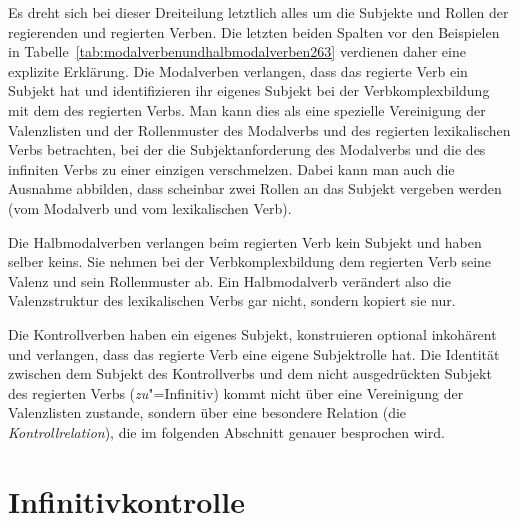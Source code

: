 

Es dreht sich bei dieser Dreiteilung letztlich alles um die Subjekte und Rollen der regierenden und regierten Verben.
Die letzten beiden Spalten vor den Beispielen in Tabelle~\ref{tab:modalverbenundhalbmodalverben263} verdienen daher eine explizite Erklärung.
Die Modalverben verlangen, dass das regierte Verb ein Subjekt hat und identifizieren ihr eigenes Subjekt bei der Verbkomplexbildung mit dem des regierten Verbs.
Man kann dies als eine spezielle Vereinigung der Valenzlisten und der Rollenmuster des Modalverbs und des regierten lexikalischen Verbs betrachten, bei der die Subjektanforderung des Modalverbs und die des infiniten Verbs zu einer einzigen verschmelzen.
Dabei kann man auch die Ausnahme abbilden, dass scheinbar zwei Rollen an das Subjekt vergeben werden (vom Modalverb und vom lexikalischen Verb).


Die Halbmodalverben verlangen beim regierten Verb kein Subjekt und haben selber keins.
Sie nehmen bei der Verbkomplexbildung dem regierten Verb seine Valenz und sein Rollenmuster ab.
Ein Halbmodalverb verändert also die Valenzstruktur des lexikalischen Verbs gar nicht, sondern kopiert sie nur.


Die Kontrollverben haben ein eigenes Subjekt, konstruieren optional inkohärent und verlangen, dass das regierte Verb eine eigene Subjektrolle hat.
Die Identität zwischen dem Subjekt des Kontrollverbs und dem nicht ausgedrückten Subjekt des regierten Verbs (\textit{zu}"=Infinitiv) kommt nicht über eine Vereinigung der Valenzlisten zustande, sondern über eine besondere Relation (die \textit{Kontrollrelation}), die im folgenden Abschnitt genauer besprochen wird.


\section{Infinitivkontrolle}
\label{sec:infinitivkontrolle}

